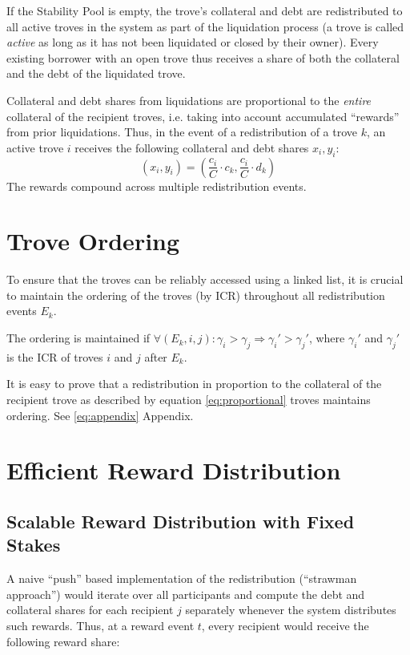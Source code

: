 \documentclass[reqno]{article}
\begin{document}
If the Stability Pool is empty, the trove's collateral and debt are redistributed to all active troves in the system as part of the liquidation process (a trove is called \textit{active} as long as it has not been liquidated or closed by their owner). Every existing borrower with an open trove thus receives a share of both the collateral and the debt of the liquidated trove.

Collateral and debt shares from liquidations are proportional to the \textit{entire} collateral of the recipient troves, i.e. taking into account accumulated “rewards” from prior liquidations. Thus, in the event of a redistribution of a trove $k$, an active trove $i$ receives the following collateral and debt shares $x_i,y_i$:  
\begin{equation} \label{eq:proportional}
  (x_i, y_i) = \left(\frac{c_i}{C} \cdot c_k, \frac{c_i}{C} \cdot d_k\right)
\end{equation}
The rewards compound across multiple redistribution events.

\section{Trove Ordering}
To ensure that the troves can be reliably accessed using a linked list, it is crucial to maintain the ordering of the troves (by ICR) throughout all redistribution events $E_k$.

The ordering is maintained if $\forall{(E_k,i,j)}: \gamma_i > \gamma_j	\Longrightarrow \gamma_i' > \gamma_j'$, where $\gamma_i'$ and $\gamma_j'$ is the ICR of troves $i$ and $j$ after $E_k$.

It is easy to prove that a redistribution in proportion to the collateral of the recipient trove as described by equation \ref{eq:proportional} troves maintains ordering. See \ref{eq:appendix} Appendix.

\section{Efficient Reward Distribution}

\subsection{Scalable Reward Distribution with Fixed Stakes}

A naive “push” based implementation of the redistribution (“strawman approach”) would iterate over all participants and compute the debt and collateral shares  for each recipient $j$ separately whenever the system distributes such rewards. Thus, at a reward event $t$, every recipient would receive the following reward share:
\end{document}
